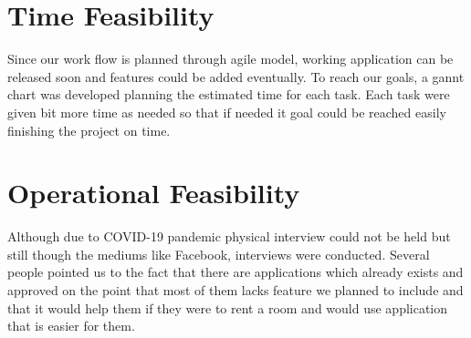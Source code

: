 \section{Time Feasibility}
Since our work flow is planned through agile model, working application can be released soon and features could be added eventually. To reach our goals, a gannt chart was developed planning the estimated time for each task. Each task were given bit more time as needed so that if needed it goal could be reached easily finishing the project on time. 
\section{Operational Feasibility}
Although due to COVID-19 pandemic physical interview could not be held but still though the mediums like Facebook, interviews were conducted. Several people pointed us to the fact that there are applications which already exists and approved on the point that most of them lacks feature we planned to include and that it would help them if they were to rent a room and would use application that is easier for them.